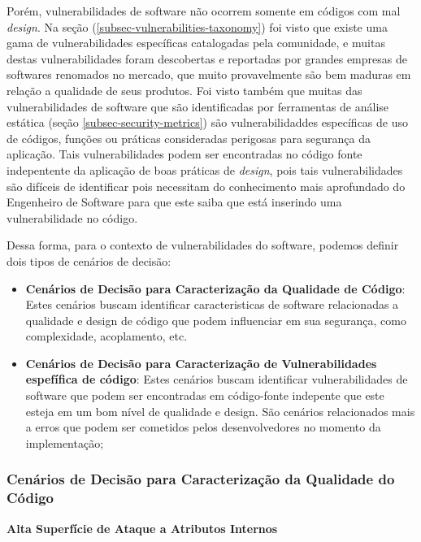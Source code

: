 %

Porém, vulnerabilidades de software não ocorrem somente em códigos com mal \emph{design}. Na seção (\ref{subsec-vulnerabilities-taxonomy}) foi visto que existe uma gama de vulnerabilidades específicas catalogadas pela comunidade, e muitas destas vulnerabilidades foram descobertas e reportadas por grandes empresas de softwares renomados no mercado, que muito provavelmente são bem maduras em relação a qualidade de seus produtos. Foi visto também que muitas das vulnerabilidades de software que são identificadas por ferramentas de análise estática (seção \ref{subsec-security-metrics}) são vulnerabilidaddes específicas de uso de códigos, funções ou práticas consideradas perigosas para segurança da aplicação. Tais vulnerabilidades podem ser encontradas no código fonte indepentente da aplicação de boas práticas de \emph{design}, pois tais vulnerabilidades são difíceis de identificar pois necessitam do conhecimento mais aprofundado do Engenheiro de Software para que este saiba que está inserindo uma vulnerabilidade no código.

%

Dessa forma, para o contexto de vulnerabilidades do software, podemos definir dois tipos de cenários de decisão:

%

\begin{itemize}
\item \textbf{Cenários de Decisão para Caracterização da Qualidade de Código}: Estes cenários buscam identificar caracteristicas de software relacionadas a qualidade e design de código que podem influenciar em sua segurança, como complexidade, acoplamento, etc.
\item \textbf{Cenários de Decisão para Caracterização de Vulnerabilidades espefífica de código}: Estes cenários buscam identificar vulnerabilidades de software que podem ser encontradas em código-fonte indepente que este esteja em um bom nível de qualidade e design. São cenários relacionados mais a erros que podem ser cometidos pelos desenvolvedores no momento da implementação;
\end{itemize}

%

\subsubsection{Cenários de Decisão para Caracterização da Qualidade do Código }

%

\textbf{Alta Superfície de Ataque a Atributos Internos}


